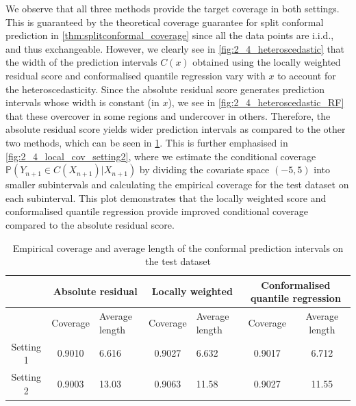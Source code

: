 \documentclass[11pt, titlepage]{article} %
\newcommand{\Prob}[1]{\mathbb{P}\left( #1 \right)}
\numberwithin{equation}{section}
\theoremstyle{definition}
\numberwithin{theorem}{section}
\numberwithin{lemma}{section}
\numberwithin{corollary}{section}
\numberwithin{proposition}{section}
\numberwithin{definition}{section}
\numberwithin{remark}{section}
\begin{document}
\noindent
We observe that all three methods provide the target coverage in both settings. This is guaranteed by the theoretical coverage guarantee for split conformal prediction in \cref{thm:splitconformal_coverage} since all the data points are i.i.d., and thus exchangeable. However, we clearly see in \cref{fig:2_4_heteroscedastic} that the width of the prediction intervals \(C(x)\) obtained using the locally weighted residual score and conformalised quantile regression vary with \(x\) to account for the heteroscedasticity. Since the absolute residual score generates prediction intervals whose width is constant (in \(x\)), we see in \cref{fig:2_4_heteroscedastic_RF} that these overcover in some regions and undercover in others. Therefore, the absolute residual score yields wider prediction intervals as compared to the other two methods, which can be seen in \cref{tab:2_4_settings1_2_results}. This is further emphasised in \cref{fig:2_4_local_cov_setting2}, where we estimate the conditional coverage \(\Prob{Y_{n+1} \in C(X_{n+1} ) | X_{n+1}}\) by dividing the covariate space \((-5,5)\) into smaller subintervals and calculating the empirical coverage for the test dataset on each subinterval. This plot demonstrates that the locally weighted score and conformalised quantile regression provide improved conditional coverage compared to the absolute residual score.

\begin{table}[h]
    \centering
    \renewcommand{\arraystretch}{1.2}
    \begin{tabular}{|c|c|p{1.5cm}|c|p{1.5cm}|c|c|}
        \hline
        & \multicolumn{2}{c|}{Absolute residual} & \multicolumn{2}{c|}{Locally weighted} & \multicolumn{2}{c|}{Conformalised quantile regression} \\
        \hline
        & Coverage & Average length & Coverage & Average length & Coverage & Average length \\
        \hline
        Setting 1 & 0.9010 & 6.616 & 0.9027 & 6.632 & 0.9017 & 6.712 \\
        Setting 2 & 0.9003 & 13.03 & 0.9063 & 11.58 & 0.9027 & 11.55 \\
        \hline
    \end{tabular}
    \caption{Empirical coverage and average length of the conformal prediction intervals on the test dataset}
    \label{tab:2_4_settings1_2_results}
\end{table}
\end{document}

